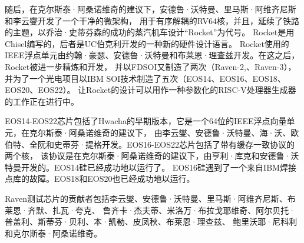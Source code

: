 随后，在克尔斯泰·阿桑诺维奇的建议下，安德鲁·沃特曼、里马斯·阿维齐尼斯和李云燮开发了一个干净的微架构，
用于有序解耦的RV64核，并且，延续了铁路的主题，以乔治·史蒂芬森的成功的蒸汽机车设计“Rocket”为代号。
Rocket是用Chisel编写的，后者是UC伯克利开发的一种新的硬件设计语言。
Rocket使用的IEEE浮点单元由约翰·豪瑟、安德鲁·沃特曼和布莱恩·理查兹开发。在这之后，Rocket被进一步精炼和开发，
并以FDSOI又制造了两次（Raven-2,、Raven-3），并为了一个光电项目以IBM SOI技术制造了五次（EOS14、EOS16、EOS18、EOS20、EOS22）。
让Rocket的设计可以用作一种参数化的RISC-V处理器生成器的工作正在进行中。

EOS14-EOS22芯片包括了Hwacha的早期版本，它是一个64位的IEEE浮点向量单元，在克尔斯泰·阿桑诺维奇的建议下，
由李云燮、安德鲁·沃特曼、海·沃、欧伯特、全阮和史蒂芬·提格开发。EOS16-EOS22芯片包括了带有缓存一致协议的两个核，
该协议是在克尔斯泰·阿桑诺维奇的建议下，由亨利·库克和安德鲁·沃特曼开发的。EOS14硅已经成功地以运行了。
EOS16硅遇到了一个来自IBM焊接点库的故障。EOS18和EOS20也已经成功地以运行。

Raven测试芯片的贡献者包括李云燮、安德鲁·沃特曼、里马斯·阿维齐尼斯、布莱恩·齐默、扎瓦·夸克、
鲁齐卡·杰夫蒂、米洛万·布拉戈耶维奇、阿尔贝托·普盖利、斯蒂芬·贝利、本·凯勒、皮凤秋、布莱恩·理查兹、
鲍里沃耶·尼科利和克尔斯泰·阿桑诺维奇。


